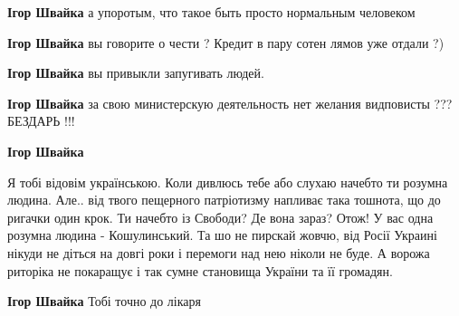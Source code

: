 \begin{itemize}
\begin{itemize}
\textbf{Ігор Швайка} а упоротым, что такое быть просто нормальным человеком

 
\textbf{Ігор Швайка} вы говорите о чести ? Кредит в пару сотен лямов уже отдали ?)

 
\textbf{Ігор Швайка} вы привыкли запугивать людей.

 
\textbf{Ігор Швайка} за свою министерскую деятельность нет желания видповисты ??? БЕЗДАРЬ !!!

 
\textbf{Ігор Швайка} 

Я тобі відовім українською. Коли дивлюсь тебе або слухаю
начебто ти розумна людина. Але.. від твого пещерного патріотизму напливає така
тошнота, що до ригачки один крок. Ти начебто із Свободи? Де вона зараз? Отож! У
вас одна розумна людина - Кошулинський. Та шо не пирскай жовчю, від Росії Украині
нікуди не діться на довгі роки і перемоги над нею ніколи не буде. А ворожа
риторіка не покаращує і так сумне становища України та її громадян.


 
\textbf{Ігор Швайка} Тобі точно до лікаря


\end{itemize}
\end{itemize}
